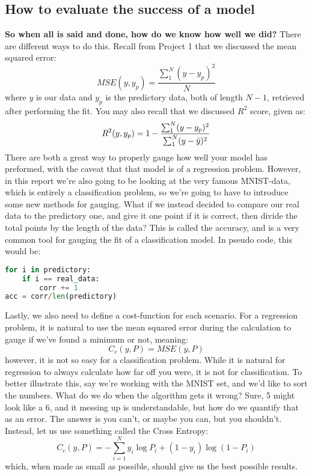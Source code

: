 \documentclass{article}
\begin{document}
\subsection{How to evaluate the success of a model}
\textbf{So when all is said and done, how do we know how well we did?} There are different ways to do this. Recall from Project 1 that we discussed the mean squared error:
\begin{equation}
    MSE(y, y_p) =  \frac{\sum_1^{N} (y - y_p)^2}{N} 
\end{equation}
where $y$ is our data and $y_p$ is the predictory data, both of length $N-1$, retrieved after performing the fit. \newline
You may also recall that we discussed $R^2$ score, given as:
\begin{equation}
    R^2(y, y_p) = 1 - \frac{\sum_1^N (y-y_p)^2}{\sum_1^N (y - \Bar{y})^2}
\end{equation}
There are both a great way to properly gauge how well your model has preformed, with the caveat that that model is of a regression problem. However, in this report we're also going to be looking at the very famous MNIST-data, which is entirely a classification problem, so we're going to have to introduce some new methods for gauging. What if we instead decided to compare our real data to the predictory one, and give it one point if it is correct, then divide the total points by the length of the data?
\newline This is called the accuracy, and is a very common tool for gauging the fit of a classification model. In pseudo code, this would be:
\begin{lstlisting}[language=Python]
for i in predictory:
    if i == real_data:
        corr += 1
acc = corr/len(predictory)
\end{lstlisting}
\newline 
Lastly, we also need to define a cost-function for each scenario. \newline
For a regression problem, it is natural to use the mean squared error during the calculation to gauge if we've found a minimum or not, meaning:
\begin{equation}
    C_r(y, P) = MSE(y, P)
\end{equation}
however, it is not so easy for a classification problem. While it is natural for regression to always calculate how far off you were, it is not for classification. \newline
To better illustrate this, say we're working with the MNIST set, and we'd like to sort the numbers. What do we do when the algorithm gets it wrong? Sure, 5 might look like a 6, and it messing up is understandable, but how do we quantify that as an error. \newline
The answer is you can't, or maybe you can, but you shouldn't. Instead, let us use something called the Cross Entropy:
\begin{equation}
    C_c(y, P) = - \sum_{i=1}^N y_i \log{P_i} + (1-y_i) \log{(1-P_i)}
\end{equation}
which, when made as small as possible, should give us the best possible results.
\end{document}
